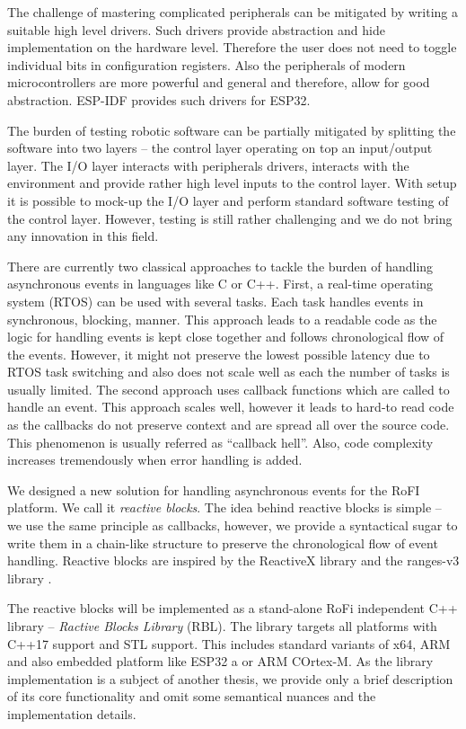 The challenge of mastering complicated peripherals can be mitigated by writing a
suitable high level drivers. Such drivers provide abstraction and hide
implementation on the hardware level. Therefore the user does not need to toggle
individual bits in configuration registers. Also the peripherals of modern
microcontrollers are more powerful and general and therefore, allow for good
abstraction. ESP-IDF provides such drivers for ESP32.

The burden of testing robotic software can be partially mitigated by splitting
the software into two layers -- the control layer operating on top an
input/output layer. The I/O layer interacts with peripherals drivers, interacts
with the environment and provide rather high level inputs to the control layer.
With setup it is possible to mock-up the I/O layer and perform standard software
testing of the control layer. However, testing is still rather challenging and
we do not bring any innovation in this field.

There are currently two classical approaches to tackle the burden of handling
asynchronous events in languages like C or C++. First, a real-time operating
system (RTOS) can be used with several tasks. Each task handles events in
synchronous, blocking, manner. This approach leads to a readable code as the
logic for handling events is kept close together and follows chronological flow
of the events. However, it might not preserve the lowest possible latency due to
RTOS task switching and also does not scale well as each the number of tasks is
usually limited. The second approach uses callback functions which are called to
handle an event. This approach scales well, however it leads to hard-to read
code as the callbacks do not preserve context and are spread all over the source
code. This phenomenon is usually referred as ``callback hell''. Also, code
complexity increases tremendously when error handling is added.

We designed a new solution for handling asynchronous events for the RoFI
platform. We call it \emph{reactive blocks}. The idea behind reactive blocks is
simple -- we use the same principle as callbacks, however, we provide a
syntactical sugar to write them in a chain-like structure to preserve the
chronological flow of event handling. Reactive blocks are inspired by the
ReactiveX library \cite{noauthor_reactivex_nodate} and the ranges-v3 library
\cite{noauthor_range-v3_nodate}.

The reactive blocks will be implemented as a stand-alone RoFi independent C++
library -- \emph{Ractive Blocks Library} (RBL). The library targets all
platforms with C++17 support and STL support. This includes standard variants of
x64, ARM and also embedded platform like ESP32 a or ARM COrtex-M. As the library
implementation is a subject of another thesis, we provide only a brief
description of its core functionality and omit some semantical nuances and the
implementation details.


